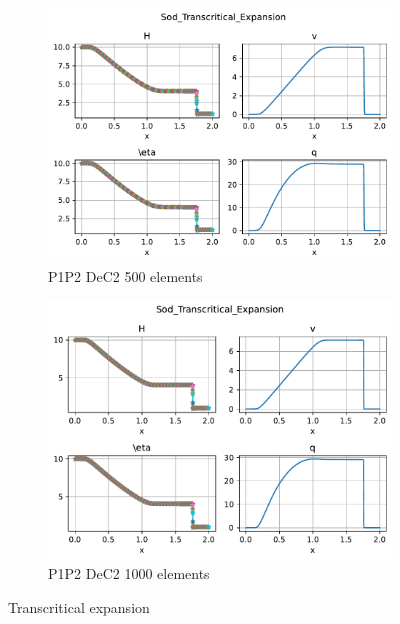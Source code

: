 \documentclass[english]{article}
\theoremstyle{thmstyleone}
\theoremstyle{thmstyletwo}
\theoremstyle{thmstylethree}
\begin{document}
\begin{figure}
{\begin{minipage}{\textwidth}
\begin{subfigure}{0.45\textwidth}
				\includegraphics[trim= 0 180 0 0, clip,width=\textwidth]{figures/transcritical_expansion/P1P2_DeC_N_el00500.pdf}
				\caption{P1P2 DeC2 500 elements}
			\end{subfigure}
			\begin{subfigure}{0.45\textwidth}
				\includegraphics[trim= 0 180 0 0, clip,width=\textwidth]{figures/transcritical_expansion/P1P2_DeC_N_el01000.pdf}
				\caption{P1P2 DeC2 1000 elements}
			\end{subfigure}
		\end{minipage}%
	}
	\caption{Transcritical expansion}\label{fig:transcritical_expansion}
\end{figure}





\end{document}
